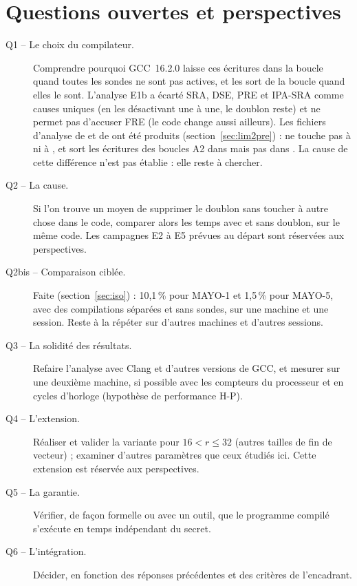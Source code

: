 \section*{Questions ouvertes et perspectives}\label{sec:persp}
\begin{description}
\item[Q1 -- Le choix du compilateur.] Comprendre pourquoi GCC~16.2.0 laisse ces écritures dans la boucle quand toutes les sondes ne sont pas actives, et les sort de la boucle quand elles le sont. L'analyse E1b a écarté SRA, DSE, PRE et IPA-SRA comme causes uniques (en les désactivant une à une, le doublon reste) et ne permet pas d'accuser FRE (le code change aussi ailleurs). Les fichiers d'analyse de  et de  ont été produits (section~\ref{sec:lim2pre}) :  ne touche pas à  ni à , et  sort les écritures des boucles A2 dans  mais pas dans . La cause de cette différence n'est pas établie : elle reste à chercher.
\item[Q2 -- La cause.] Si l'on trouve un moyen de supprimer le doublon sans toucher à autre chose dans le code, comparer alors les temps avec et sans doublon, sur le même code. Les campagnes E2 à E5 prévues au départ sont réservées aux perspectives.
\item[Q2bis -- Comparaison ciblée.] Faite (section~\ref{sec:iso}) : 10,1\,\% pour MAYO-1 et 1,5\,\% pour MAYO-5, avec des compilations séparées et sans sondes, sur une machine et une session. Reste à la répéter sur d'autres machines et d'autres sessions.
\item[Q3 -- La solidité des résultats.] Refaire l'analyse avec Clang et d'autres versions de GCC, et mesurer sur une deuxième machine, si possible avec les compteurs du processeur et en cycles d'horloge (hypothèse de performance H-P).
\item[Q4 -- L'extension.] Réaliser et valider la variante pour $16<r\le32$ (autres tailles de fin de vecteur) ; examiner d'autres paramètres que ceux étudiés ici. Cette extension est réservée aux perspectives.
\item[Q5 -- La garantie.] Vérifier, de façon formelle ou avec un outil, que le programme compilé s'exécute en temps indépendant du secret.
\item[Q6 -- L'intégration.] Décider, en fonction des réponses précédentes et des critères de l'encadrant.
\end{description}
